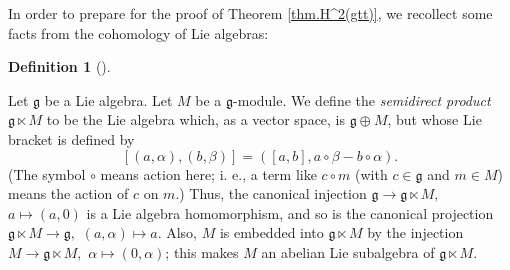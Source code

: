 \documentclass
[numbers=enddot,12pt,final,onecolumn,german,notitlepage]{scrartcl}%
\theoremstyle{definition}
\newtheorem{defi}[theo]{Definition}
\newenvironment{definition}[1][]
{\begin{defi}[#1]\begin{leftbar}}
{\end{leftbar}\end{defi}}
\begin{document}
In order to prepare for the proof of Theorem \ref{thm.H^2(gtt)}, we recollect
some facts from the cohomology of Lie algebras:

\begin{definition}
Let $\mathfrak{g}$ be a Lie algebra. Let $M$ be a $\mathfrak{g}$-module. We
define the \textit{semidirect product} $\mathfrak{g}\ltimes M$ to be the Lie
algebra which, as a vector space, is $\mathfrak{g}\oplus M$, but whose Lie
bracket is defined by%
\[
\left[  \left(  a,\alpha\right)  ,\left(  b,\beta\right)  \right]  =\left(
\left[  a,b\right]  ,a\circ\beta-b\circ\alpha\right)  .
\]
(The symbol $\circ$ means action here; i. e., a term like $c\circ m$ (with
$c\in\mathfrak{g}$ and $m\in M$) means the action of $c$ on $m$.) Thus, the
canonical injection $\mathfrak{g}\rightarrow\mathfrak{g}\ltimes M,$
$a\mapsto\left(  a,0\right)  $ is a Lie algebra homomorphism, and so is the
canonical projection $\mathfrak{g}\ltimes M\rightarrow\mathfrak{g},$ $\left(
a,\alpha\right)  \mapsto a$. Also, $M$ is embedded into $\mathfrak{g}\ltimes
M$ by the injection $M\rightarrow\mathfrak{g}\ltimes M,$ $\alpha\mapsto\left(
0,\alpha\right)  $; this makes $M$ an abelian Lie subalgebra of $\mathfrak{g}%
\ltimes M$.
\end{definition}
\end{document}
